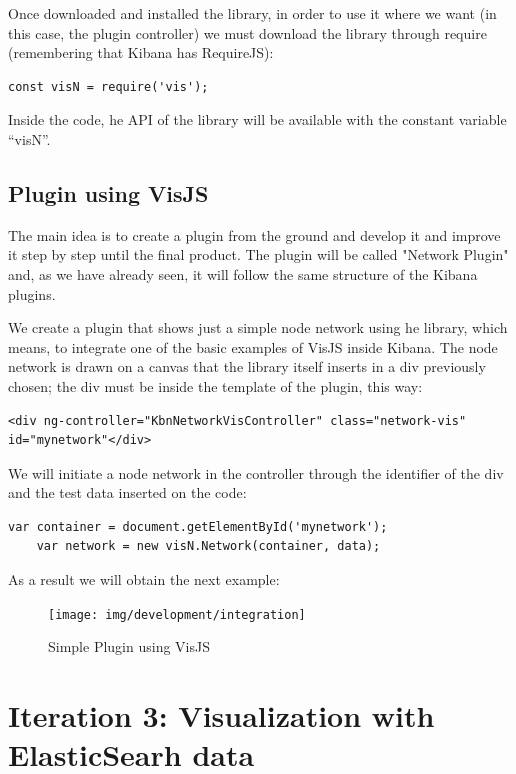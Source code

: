 \documentclass[a4paper, 12pt]{book}
\begin{document}
Once downloaded and installed the library, in order to use it where we want (in this case, the plugin controller) we must download the library through require (remembering that Kibana has RequireJS):

\begin{lstlisting}[frame=single]
	const visN = require('vis');
\end{lstlisting}

Inside the code, he API of the library will be available with the constant variable “visN”.

\subsection{Plugin using VisJS}

The main idea is to create a plugin from the ground and develop it and improve it step by step until the final product. The plugin will be called "Network Plugin" and, as we have already seen, it will follow the same structure of the Kibana plugins.

We create a plugin that shows just a simple node network using he library, which means, to integrate one of the basic examples of VisJS inside Kibana. The node network is drawn on a canvas that the library itself inserts in a div previously chosen; the div must be inside the template of the plugin, this way: 

\begin{lstlisting}[frame=single]
	<div ng-controller="KbnNetworkVisController" class="network-vis" id="mynetwork"</div>
\end{lstlisting}

We will initiate a node network in the controller through the identifier of the div and the test data inserted on the code:

\begin{lstlisting}[frame=single]
	var container = document.getElementById('mynetwork');
	var network = new visN.Network(container, data);
\end{lstlisting}

As a result we will obtain the next example:

\begin{figure}[H]
  \centering
  \texttt{[image: img/development/integration]}
  \caption{Simple Plugin using VisJS}
  \label{fig:examplepluginvisjs}
\end{figure}


\section{Iteration 3: Visualization with ElasticSearh data}
\end{document}
